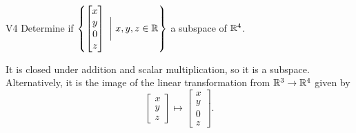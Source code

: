 \documentclass{sbgLAquiz}
\begin{document}
\begin{extract}\newpage\end{extract}
\begin{problem}{V4}
Determine if $\left\{ \begin{bmatrix} x \\ y \\ 0 \\ z \end{bmatrix}\  \bigg|\ x,y,z \in \mathbb{R}\right\}$  a subspace of $\mathbb{R}^4$.
\end{problem}
\begin{solution}
It is closed under addition and scalar multiplication, so it is a subspace.  Alternatively, it is the image of the linear transformation from $\mathbb{R}^3 \rightarrow \mathbb{R}^4$ given by $$\begin{bmatrix} x \\ y \\ z \end{bmatrix} \mapsto  \begin{bmatrix} x \\ y \\ 0 \\ z \end{bmatrix}.$$
\end{solution}
\end{document}
